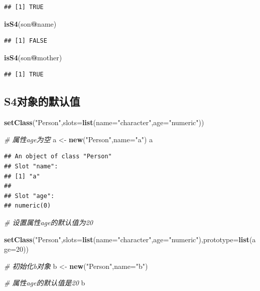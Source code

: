 \documentclass[]{book}
\newenvironment{Shaded}{\begin{snugshade}}{\end{snugshade}}
\newcommand{\KeywordTok}[1]{\textcolor[rgb]{0.13,0.29,0.53}{\textbf{#1}}}
\newcommand{\DataTypeTok}[1]{\textcolor[rgb]{0.13,0.29,0.53}{#1}}
\newcommand{\DecValTok}[1]{\textcolor[rgb]{0.00,0.00,0.81}{#1}}
\newcommand{\StringTok}[1]{\textcolor[rgb]{0.31,0.60,0.02}{#1}}
\newcommand{\CommentTok}[1]{\textcolor[rgb]{0.56,0.35,0.01}{\textit{#1}}}
\newcommand{\OperatorTok}[1]{\textcolor[rgb]{0.81,0.36,0.00}{\textbf{#1}}}
\newcommand{\NormalTok}[1]{#1}
\begin{document}
\begin{verbatim}
## [1] TRUE
\end{verbatim}

\begin{Shaded}
\begin{Highlighting}[]
\KeywordTok{isS4}\NormalTok{(son}\OperatorTok{@}\NormalTok{name)}
\end{Highlighting}
\end{Shaded}

\begin{verbatim}
## [1] FALSE
\end{verbatim}

\begin{Shaded}
\begin{Highlighting}[]
\KeywordTok{isS4}\NormalTok{(son}\OperatorTok{@}\NormalTok{mother)}
\end{Highlighting}
\end{Shaded}

\begin{verbatim}
## [1] TRUE
\end{verbatim}

\subsection{S4对象的默认值}\label{s4}

\begin{Shaded}
\begin{Highlighting}[]
\KeywordTok{setClass}\NormalTok{(}\StringTok{"Person"}\NormalTok{,}\DataTypeTok{slots=}\KeywordTok{list}\NormalTok{(}\DataTypeTok{name=}\StringTok{"character"}\NormalTok{,}\DataTypeTok{age=}\StringTok{"numeric"}\NormalTok{))}

\CommentTok{# 属性age为空}
\NormalTok{a <-}\StringTok{ }\KeywordTok{new}\NormalTok{(}\StringTok{"Person"}\NormalTok{,}\DataTypeTok{name=}\StringTok{"a"}\NormalTok{)}
\NormalTok{a}
\end{Highlighting}
\end{Shaded}

\begin{verbatim}
## An object of class "Person"
## Slot "name":
## [1] "a"
## 
## Slot "age":
## numeric(0)
\end{verbatim}

\begin{Shaded}
\begin{Highlighting}[]
\CommentTok{# 设置属性age的默认值为20}

\KeywordTok{setClass}\NormalTok{(}\StringTok{"Person"}\NormalTok{,}\DataTypeTok{slots=}\KeywordTok{list}\NormalTok{(}\DataTypeTok{name=}\StringTok{"character"}\NormalTok{,}\DataTypeTok{age=}\StringTok{"numeric"}\NormalTok{),}\DataTypeTok{prototype=}\KeywordTok{list}\NormalTok{(}\DataTypeTok{age=}\DecValTok{20}\NormalTok{))}

\CommentTok{# 初始化b对象}
\NormalTok{b <-}\StringTok{ }\KeywordTok{new}\NormalTok{(}\StringTok{"Person"}\NormalTok{,}\DataTypeTok{name=}\StringTok{"b"}\NormalTok{)}

\CommentTok{# 属性age的默认值是20}
\NormalTok{b }
\end{Highlighting}
\end{Shaded}
\end{document}
